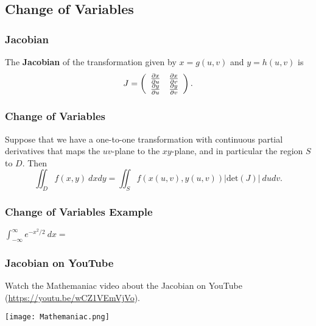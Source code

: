 \documentclass{beamer}
\begin{document}
\subsection{Change of Variables}

\begin{frame}
\frametitle{Jacobian}
\begin{Definition}
The {\bf Jacobian} of the transformation given by $x = g(u, v)$ and $y = h(u, v)$ is
$$
J = \left(\begin{array}{c c} \frac{\partial x}{\partial u}	&	\frac{\partial x}{\partial v}\\ \frac{\partial y}{\partial u} &	\frac{\partial y}{\partial v}\end{array}\right).
$$
\end{Definition} 

\end{frame}

\begin{frame}
\frametitle{Change of Variables}
Suppose that we have a one-to-one transformation with continuous partial derivatives that maps the $uv$-plane to the $xy$-plane, and in particular the region $S$ to $D$. Then
$$
\iint_D f(x, y)\ dxdy = \iint_S f\left(x(u, v), y(u, v)\right)\left|\text{det}(J)\right|\ dudv.
$$

\end{frame}

\begin{frame}[t]
\frametitle{Change of Variables Example}
\begin{Example}
$\displaystyle\int_{-\infty}^{\infty} e^{-x^2/2}\ dx = $
\end{Example}

\end{frame}

\begin{frame}
\frametitle{Jacobian on YouTube}
\small
Watch the Mathemaniac video about the Jacobian on YouTube (\url{https://youtu.be/wCZ1VEmVjVo}).
\begin{center}
\texttt{[image: Mathemaniac.png]}
\end{center}
\end{frame}
\end{document}
